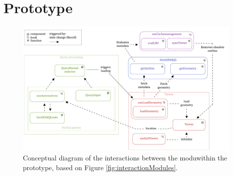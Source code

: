 \chapter{Prototype} \label{ch:prototype}

\begin{figure}[H]
    \centering
    \includegraphics[width=\textwidth]{figures/pdf/interactions_prototype.pdf}
    \caption[Interactions prototype]{Conceptual diagram of the interactions between the moduwithin the prototype, based on Figure \ref{fig:interactionModules}.}
    \label{fig:interactionPrototype}
\end{figure}